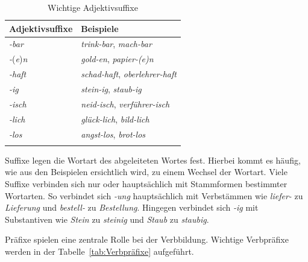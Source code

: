 \begin{table}[!htbp]
  \centering
  \begin{tabular}{l l}
    \lsptoprule
    Adjektivsuffixe & Beispiele \\
    \hline
    \textit{-bar} & \textit{trink-bar}, \textit{mach-bar}\\
    
    \textit{-}(\textit{e})\textit{n} & \textit{gold-en}, \textit{papier-(e)n}\\
    
    \textit{-haft} & \textit{schad-haft}, \textit{oberlehrer-haft}\\
    
    \textit{-ig} & \textit{stein-ig}, \textit{staub-ig}\\
    
    \textit{-isch} & \textit{neid-isch}, \textit{verführer-isch}\\
    
    \textit{-lich} & \textit{glück-lich}, \textit{bild-lich}\\
    
    \textit{-los} & \textit{angst-los}, \textit{brot-los}\\
    
    
    \lspbottomrule 
  \end{tabular}
  \caption{Wichtige Adjektivsuffixe}
  \label{tab:Adjektivsuffixe}
\end{table}

Suffixe legen die Wortart des abgeleiteten Wortes fest. Hierbei kommt es häufig, wie aus den Beispielen ersichtlich wird, zu einem Wechsel der Wortart. Viele Suffixe verbinden sich nur oder hauptsächlich mit Stammformen bestimmter Wortarten. So verbindet sich \textit{-ung} hauptsächlich mit Verbstämmen wie \textit{liefer-} zu \textit{Lieferung} und \textit{bestell-} zu \textit{Bestellung}. Hingegen verbindet sich \textit{-ig} mit Substantiven wie \textit{Stein} zu \textit{steinig} und \textit{Staub} zu \textit{staubig}.

Präfixe spielen eine zentrale Rolle bei der Verbbildung. Wichtige Verbpräfixe werden in der Tabelle~\ref{tab:Verbpräfixe} aufgeführt.

